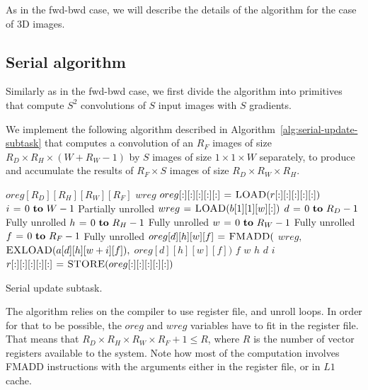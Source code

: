   As in the fwd-bwd case, we will describe the details of the
  algorithm for the case of 3D images.
  \subsection{Serial algorithm}

  Similarly as in the fwd-bwd case, we first divide the algorithm into
  primitives that compute $S^2$ convolutions of $S$ input images with
  $S$ gradients.

  We implement the following algorithm described in
  Algorithm~\ref{alg:serial-update-subtask} that computes a
  convolution of an $R_F$ images of size $R_D \times R_H \times (W + R_W
  - 1)$ by $S$ images of size $1 \times 1 \times W$ separately, to
  produce and accumulate the results of $R_F \times S$ images of size
  $R_D \times R_W \times R_H$.

  \begin{algorithm}
    {\footnotesize
      \begin{codebox}
        \li {} $oreg[R_D][R_H][R_W][R_F]$
        \li {} $wreg$
        \li $oreg[:][:][:][:][:] \mathrel{\hspace{1pt}=\hspace{1pt}} \textnormal{\scshape LOAD}(r[:][:][:][:][:])$
        \li \For $i \gets 0 \To W-1$ \Comment Partially unrolled
        \li   \Do $wreg \mathrel{\hspace{1pt}=\hspace{1pt}} \textnormal{\scshape LOAD}(b[1][1][w][:])$
        \li   \For $d \gets 0 \To R_D-1$ \Comment Fully unrolled
        \li   \Do \For $h \gets 0 \To R_H-1$  \Comment Fully unrolled
        \li   \Do \For $w \gets 0 \To R_W-1$  \Comment Fully unrolled
        \li       \For $f \gets 0 \To R_F-1$   \Comment Fully unrolled
        \li   \Do $oreg[d][h][w][f] \mathrel{\hspace{1pt}=\hspace{1pt}} \textnormal{\scshape FMADD}($
        \li   \Do $wreg,$
        \li       $\textnormal{\scshape EXLOAD}(a[d][h][w+i][f]),$
        \li       $oreg[d][h][w][f])$
        \End
        \End \li {} $f$
        \End \li {} $w$
        \End \li {} $h$
        \End \li {} $d$
        \End \li {} $i$
        \li $r[:][:][:][:][:] \mathrel{\hspace{1pt}=\hspace{1pt}} \textnormal{\scshape STORE}(oreg[:][:][:][:][:])$
      \end{codebox}
    \caption{Serial update subtask.}
    \label{alg:serial-update-subtask}
    }
  \end{algorithm}

  The algorithm relies on the compiler to use register file, and
  unroll loops.  In order for that to be possible, the $oreg$ and
  $wreg$ variables have to fit in the register file.  That means that
  $R_D \times R_H \times R_W \times R_F + 1 \le R$, where $R$ is the
  number of vector registers available to the system.  Note how most
  of the computation involves FMADD instructions with the arguments
  either in the register file, or in $L1$ cache.

